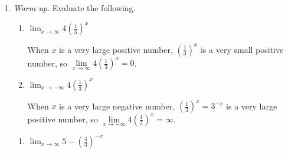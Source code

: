 \documentclass{article}
\begin{document}
\begin{enumerate}
\item  \emph{Warm up.} Evaluate the following.


    \begin{enumerate}
    \item
      \begin{problem}
        $\displaystyle \lim_{x \to \infty} 4 \left( \frac{1}{3} \right)^x$
      \end{problem}

      \begin{solution}
        When $x$ is a very large positive number, $(\frac{1}{3})^x$ is a very small positive
        number, so $\lim\limits_{x \to \infty} 4 \left( \frac{1}{3} \right)^x=0$.
      \end{solution}

    \item
      \begin{problem}
        $\displaystyle \lim_{x \to -\infty} 4 \left( \frac{1}{3} \right)^x$
      \end{problem}

      \begin{solution}
        When $x$ is a very large negative number, $(\frac{1}{3})^x=3^{-x}$ is a very large positive 
        number, so $\lim\limits_{x \to -\infty} 4 \left( \frac{1}{3} \right)^x=\infty$.
      \end{solution}

    \end{enumerate}
  \probonly{\end{multicols}}

  \pspace{\vfill}

  \begin{enumerate}[start=3]
  \item
    \begin{problem}
      $\displaystyle \lim_{x \to \infty} 5 - \left( \frac{4}{3} \right)^{-x}$ 
    \end{problem}


\end{enumerate}
\end{enumerate}
\end{document}
